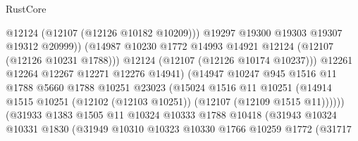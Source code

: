 \begin{lexlean}{RustCore}
\begin{coremodule}
                                        @12124
                                        (@12107 (@12126 @10182 @10209)))
                                      @19297
                                      @19300
                                      @19303
                                      @19307
                                      @19312
                                      @20999))
                                  (@14987
                                    @10230
                                    @1772
                                    @14993
                                    @14921
                                    @12124
                                    (@12107 (@12126 @10231 @1788)))
                                  @12124
                                  (@12107 (@12126 @10174 @10237)))
                                @12261
                                @12264
                                @12267
                                @12271
                                @12276
                                @14941)
                              (@14947
                                @10247
                                @945
                                @1516
                                @11
                                @1788
                                @5660
                                @1788
                                @10251
                                @23023
                                (@15024
                                  @1516
                                  @11
                                  @10251
                                  (@14914
                                    @1515
                                    @10251
                                    (@12102 (@12103 @10251))
                                    (@12107 (@12109 @1515 @11))))))
                            (@31933
                              @1383
                              @1505
                              @11
                              @10324
                              @10333
                              @1788
                              @10418
                              (@31943
                                @10324
                                @10331
                                @1830
                                (@31949
                                  @10310
                                  @10323
                                  @10330
                                  @1766
                                  @10259
                                  @1772
                                  (@31717

\end{coremodule}
\end{lexlean}
